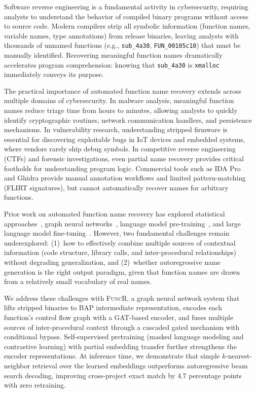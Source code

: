 \documentclass[sigconf,nonacm]{acmart}
\newcommand{\sysname}{\textsc{FuncR}}
\begin{document}
Software reverse engineering is a fundamental activity in cybersecurity, requiring analysts to understand the behavior of compiled binary programs without access to source code. Modern compilers strip all symbolic information (function names, variable names, type annotations) from release binaries, leaving analysts with thousands of unnamed functions (e.g., \texttt{sub\_4a30}, \texttt{FUN\_00105c10}) that must be manually identified. Recovering meaningful function names dramatically accelerates program comprehension: knowing that \texttt{sub\_4a30} is \texttt{xmalloc} immediately conveys its purpose.

The practical importance of automated function name recovery extends across multiple domains of cybersecurity. In malware analysis, meaningful function names reduce triage time from hours to minutes, allowing analysts to quickly identify cryptographic routines, network communication handlers, and persistence mechanisms. In vulnerability research, understanding stripped firmware is essential for discovering exploitable bugs in IoT devices and embedded systems, where vendors rarely ship debug symbols. In competitive reverse engineering (CTFs) and forensic investigations, even partial name recovery provides critical footholds for understanding program logic. Commercial tools such as IDA Pro and Ghidra provide manual annotation workflows and limited pattern-matching (FLIRT signatures), but cannot automatically recover names for arbitrary functions.

Prior work on automated function name recovery has explored statistical approaches~\cite{debin}, graph neural networks~\cite{nero}, language model pre-training~\cite{symlm}, and large language model fine-tuning~\cite{symgen}. However, two fundamental challenges remain underexplored: (1)~how to effectively combine multiple sources of contextual information (code structure, library calls, and inter-procedural relationships) without degrading generalization, and (2)~whether autoregressive name generation is the right output paradigm, given that function names are drawn from a relatively small vocabulary of real names.

We address these challenges with \sysname{}, a graph neural network system that lifts stripped binaries to BAP intermediate representation, encodes each function's control flow graph with a GAT-based encoder, and fuses multiple sources of inter-procedural context through a cascaded gated mechanism with conditional bypass. Self-supervised pretraining (masked language modeling and contrastive learning) with partial embedding transfer further strengthens the encoder representations. At inference time, we demonstrate that simple $k$-nearest-neighbor retrieval over the learned embeddings outperforms autoregressive beam search decoding, improving cross-project exact match by 4.7 percentage points with zero retraining.
\end{document}
